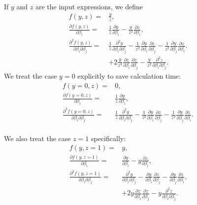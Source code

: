\documentclass[12pt,a4paper]{article}
\begin{document}
\begin{description}
    If $y$ and $z$ are the input expressions, we define
  \begin{align*}
    f(y, z) =& \frac{y}{z}, \\
    \frac{\partial f(y, z)}{\partial \beta_i} =& \frac{1}{z}\frac{\partial y}{\partial \beta_i}   - \frac{y}{z^2}  \frac{\partial z}{\partial \beta_i}, \\
    \frac{\partial^2 f(y, z)}{\partial \beta_i \partial \beta_j} =&
     \frac{1}{z}\frac{\partial^2 y}{\partial \beta_i \partial \beta_j} 
    -   \frac{1}{z^2} \frac{\partial y}{\partial \beta_i}  \frac{\partial z}{\partial \beta_j}
    - \frac{1}{z^2}  \frac{\partial y}{\partial \beta_j}  \frac{\partial z}{\partial \beta_i}. \\
 &  + 2 \frac{y}{z^3}  \frac{\partial z}{\partial \beta_i}  \frac{\partial z}{\partial \beta_j}
    - \frac{y}{z^2}  \frac{\partial^2 z}{\partial \beta_i \partial \beta_j}.
\end{align*}
  We treat the case $y=0$ explicitly to save calculation time:
  \begin{align*}
    f(y=0, z) =& 0, \\
    \frac{\partial f(y=0, z)}{\partial \beta_i} =& \frac{1}{z}\frac{\partial y}{\partial \beta_i}, \\
    \frac{\partial^2 f(y=0, z)}{\partial \beta_i \partial \beta_j} =&
    \frac{1}{z}\frac{\partial^2 y}{\partial \beta_i \partial \beta_j} 
    -   \frac{1}{z^2} \frac{\partial y}{\partial \beta_i}  \frac{\partial z}{\partial \beta_j}
    - \frac{1}{z^2}  \frac{\partial y}{\partial \beta_j}  \frac{\partial z}{\partial \beta_i}. \\
\end{align*}


  We also treat the case $z=1$ specifically:
   \begin{align*}
    f(y, z=1) =& y, \\
    \frac{\partial f(y, z=1)}{\partial \beta_i} =& \frac{\partial y}{\partial \beta_i}   - y \frac{\partial z}{\partial \beta_i}, \\
    \frac{\partial^2 f(y, z=1 )}{\partial \beta_i \partial \beta_j} =&
     \frac{\partial^2 y}{\partial \beta_i \partial \beta_j} 
    -   \frac{\partial y}{\partial \beta_i}  \frac{\partial z}{\partial \beta_j}
    -  \frac{\partial y}{\partial \beta_j}  \frac{\partial z}{\partial \beta_i}. \\
 &   + 2 y  \frac{\partial z}{\partial \beta_i}  \frac{\partial z}{\partial \beta_j}
    - y  \frac{\partial^2 z}{\partial \beta_i \partial \beta_j}.
   \end{align*}
   


\end{description}
\end{document}

